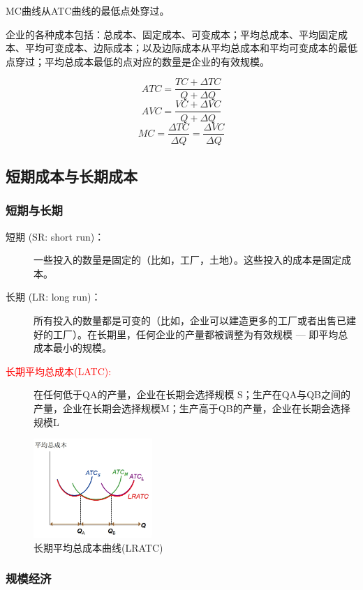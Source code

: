 \documentclass[12pt, a4paper]{article}
\begin{document}
MC曲线从ATC曲线的最低点处穿过。

企业的各种成本包括：总成本、固定成本、可变成本；平均总成本、平均固定成本、平均可变成本、边际成本；以及边际成本从平均总成本和平均可变成本的最低点穿过；平均总成本最低的点对应的数量是企业的有效规模。

\[ ATC = \frac{TC + \Delta TC}{Q + \Delta Q} \]
\[ AVC = \frac{VC + \Delta VC}{Q + \Delta Q} \]
\[ MC = \frac{\Delta TC}{\Delta Q} = \frac{\Delta VC}{\Delta Q} \]

\subsection{短期成本与长期成本}
\subsubsection{短期与长期}

\begin{description}
  \item[短期 (SR: short run)：] 一些投入的数量是固定的（比如，工厂，土地）。这些投入的成本是固定成本。
  \item[长期 (LR: long run)：] 所有投入的数量都是可变的（比如，企业可以建造更多的工厂或者出售已建好的工厂）。在长期里，任何企业的产量都被调整为有效规模 — 即平均总成本最小的规模。
  \item[\textcolor{red}{长期平均总成本(LATC):}] 在任何低于QA的产量，企业在长期会选择规模 S；生产在QA与QB之间的产量，企业在长期会选择规模M；生产高于QB的产量，企业在长期会选择规模L 
\end{description}


\begin{figure}[H] 
  \centering %
  \includegraphics[width=0.4\textwidth]{长期平均总成本.png} 
  \caption{长期平均总成本曲线(LRATC)} %
\end{figure}

\subsubsection{规模经济}
\end{document}
